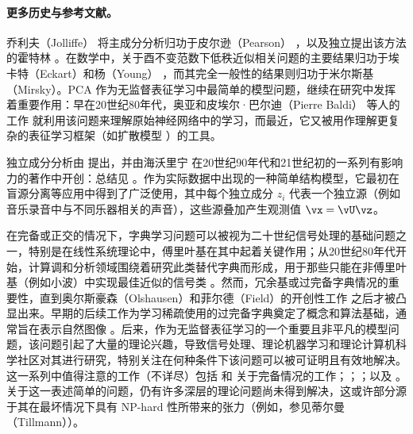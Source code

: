 \documentclass[../../book-main_zh.tex]{subfiles}
\begin{document}
\paragraph{更多历史与参考文献。}
乔利夫（Jolliffe）\cite{Jolliffe1986} 将主成分分析归功于皮尔逊（Pearson）
\cite{Pearson1901}，以及独立提出该方法的霍特林
\cite{Hotelling1933}。在数学中，关于酉不变范数下低秩近似相关问题的主要结果归功于埃卡特（Eckart）和杨（Young）
\cite{Eckart1936-ep}，而其完全一般性的结果则归功于米尔斯基（Mirsky）\cite{Mirsky1960-ek}。PCA
作为无监督表征学习中最简单的模型问题，继续在研究中发挥着重要作用：早在20世纪80年代，奥亚和皮埃尔·巴尔迪（Pierre Baldi）
等人的工作 \cite{Oja1982SimplifiedNM,Baldi89}
就利用该问题来理解原始神经网络中的学习，而最近，它又被用作理解更复杂的表征学习框架（如扩散模型 \cite{wang2024diffusion}）的工具。

独立成分分析由 \textcite{Ans-1985} 提出，并由海沃里宁
在20世纪90年代和21世纪初的一系列有影响力的著作中开创：总结见
\textcite{Hyvrinen-2000}。作为实际数据中出现的一种简单结构模型，它最初在盲源分离等应用中得到了广泛使用，其中每个独立成分
$z_i$ 代表一个独立源（例如音乐录音中与不同乐器相关的声音），这些源叠加产生观测值 $\vx = \vU \vz$。

在完备或正交的情况下，字典学习问题可以被视为二十世纪信号处理的基础问题之一，特别是在线性系统理论中，傅里叶基在其中起着关键作用；从20世纪80年代开始，计算调和分析领域围绕着研究此类替代字典而形成，用于那些只能在非傅里叶基（例如小波）中实现最佳近似的信号类
\cite{Donoho1998-zf}。然而，冗余基或过完备字典情况的重要性，直到奥尔斯豪森（Olshausen）和菲尔德（Field）的开创性工作
\cite{Olshausen1996-ap,Olshausen1997-yv}
之后才被凸显出来。早期的后续工作为学习稀疏使用的过完备字典奠定了概念和算法基础，通常旨在表示自然图像
\cite{Donoho2001-tl,DonohoD2003-PNAS,Elad2006-yi,Murray2007-cw,aharon2006k,Mairal2014-nq,Gribonval2015-fy}。后来，作为无监督表征学习的一个重要且非平凡的模型问题，该问题引起了大量的理论兴趣，导致信号处理、理论机器学习和理论计算机科学社区对其进行研究，特别关注在何种条件下该问题可以被可证明且有效地解决。这一系列中值得注意的工作（不详尽）包括
\textcite{Spielman2012-tl} 和 \textcite{sun2017complete_a}
关于完备情况的工作；\textcite{pmlr-v40-Arora15}；\textcite{Barak2015-uu}；以及
\textcite{Qu2020Geometric}。关于这一表述简单的问题，仍有许多深层的理论问题尚未得到解决，这或许部分源于其在最坏情况下具有 NP-hard 性所带来的张力（例如，参见蒂尔曼（Tillmann）\cite{Tillmann2015-up}）。
\end{document}
